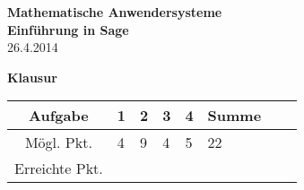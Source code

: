 \usepackage[svgnames]{xcolor} %



\parindent0cm 




\begin{center}
\textbf{\LARGE Mathematische Anwendersysteme }\\
\textbf{\LARGE Einführung in Sage}\\
\medskip
26.4.2014
\end{center}

\begin{center}
\Huge \textbf{Klausur}
\end{center}
\bigskip\bigskip\bigskip
\Large
\begin{center}
\begin{tabular}{|Sl||p{0.5cm}|p{0.5cm}|p{0.5cm}|p{0.5cm}|Sc|}
\hline
Aufgabe & \textbf{1} & \textbf{2} & \textbf{3} & \textbf{4} & \textbf{Summe}\\
\hline
Mögl. Pkt. &  4  & 9  & 4  & 5   &  22  \\
\hline
Erreichte Pkt. &    &   &   &   &   \\
\hline
\end{tabular}
\end{center}


